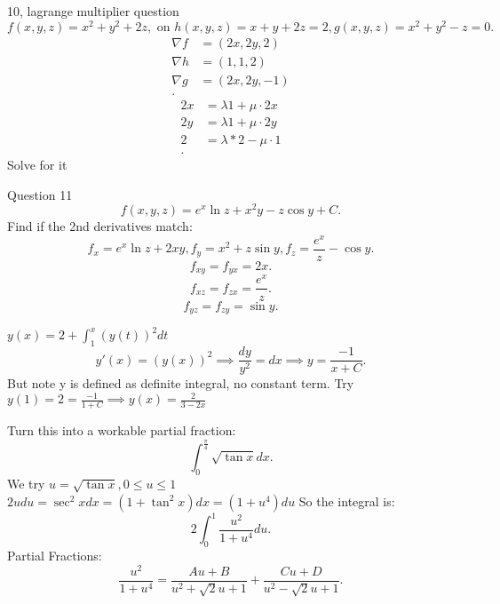 \begin{example}
	10, lagrange multiplier question
	\[
	f\left( x,y,z \right)  = x^2 + y^2 + 2z, \text{ on } h\left( x,y,z \right)  = x + y + 2z = 2, g\left( x,y,z  \right) = x^2 + y^2 - z = 0
	.\] 
	\begin{align*}
		\nabla f &=  \left( 2x,2y,2 \right)  \\
		\nabla h &= (1,1,2)\\
		\nabla g &= \left( 2x,2y,-1 \right)  \\
	.\end{align*}
	\begin{align*}
		2x &= \lambda 1 + \mu \cdot  2x \\
		2y &= \lambda 1 + \mu \cdot  2y \\
		2 &= \lambda * 2 - \mu \cdot  1 \\
	.\end{align*}
	Solve for it
\end{example}
\begin{example}
	Question 11\\
	\[
	f\left( x,y,z \right)  = e^{x}\ln z + x^2y - z \cos y + C
	.\] 
	Find if the 2nd derivatives match:
	\[
	f_x = e^{x}\ln z + 2xy, f_y = x^2 + z \sin y, f_z = \frac{e^x}{z} - \cos y
	.\] 
	\[
	f_{xy} = f_{yx} = 2x
	.\] 
	\[
	f_{xz} = f_{zx} = \frac{e^x}{z}
	.\] 
	\[
	f_{yz} = f_{zy} = \sin y
	.\] 
\end{example}

\begin{example}
	$ y (x) = 2 + \int_{1}^{x} \left( y(t) \right) ^2dt $ 
	\[
	y'(x) = \left( y(x) \right) ^2\implies \frac{dy}{y^2} = dx\implies y  = \frac{-1}{x+C}
	.\] 
	But note y is defined as definite integral, no constant term. Try $y(1) = 2 = \frac{-1}{1+C} \implies y(x) = \frac{2}{3-2x}$
\end{example}
\begin{example}
	Turn this into a workable partial fraction:
	\[
		\int_{0}^{\frac{\pi}{4}} \sqrt{\tan x} dx
	.\] 
	We try $u = \sqrt{\tan x}, 0 \le  u \le  1 $\\
	$ 2udu = \sec ^2 x dx = \left(  1 + \tan ^2 x\right) dx = \left( 1 + u^{4} \right) du$
	So the integral is:
	\[
	2 \int_{0}^{1} \frac{u^2}{1 + u^{4}}du 
	.\] 
	Partial Fractions: 
	\[
	\frac{u^2}{1 + u^{4}} = \frac{Au + B}{u^2 + \sqrt{2} u + 1} + \frac{Cu + D}{u^2 - \sqrt{2} u + 1}
	.\] 

\end{example}
